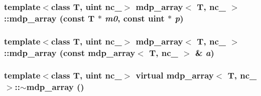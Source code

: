 \label{classmdp__array_abf3b0ca804544eac3be7d8e499eeb089}
\hypertarget{classmdp__array_a1932c8ea14f2fc8cb7343f9834154521}{
\subsubsection[{mdp\_\-array}]{\setlength{\rightskip}{0pt plus 5cm}template$<$class T, uint nc\_\-$>$ {\bf mdp\_\-array}$<$ T, nc\_\- $>$::{\bf mdp\_\-array} (const T $\ast$ {\em m0}, \/  const {\bf uint} $\ast$ {\em p})}}
\label{classmdp__array_a1932c8ea14f2fc8cb7343f9834154521}
\hypertarget{classmdp__array_af266114d51b7b0e038cb555ba02d83d4}{
\subsubsection[{mdp\_\-array}]{\setlength{\rightskip}{0pt plus 5cm}template$<$class T, uint nc\_\-$>$ {\bf mdp\_\-array}$<$ T, nc\_\- $>$::{\bf mdp\_\-array} (const {\bf mdp\_\-array}$<$ T, nc\_\- $>$ \& {\em a})}}
\label{classmdp__array_af266114d51b7b0e038cb555ba02d83d4}
\hypertarget{classmdp__array_a962dc25e9c53d9f6e215b0ef952fc96b}{
\subsubsection[{$\sim$mdp\_\-array}]{\setlength{\rightskip}{0pt plus 5cm}template$<$class T, uint nc\_\-$>$ virtual {\bf mdp\_\-array}$<$ T, nc\_\- $>$::$\sim${\bf mdp\_\-array} ()}}
\label{classmdp__array_a962dc25e9c53d9f6e215b0ef952fc96b}


